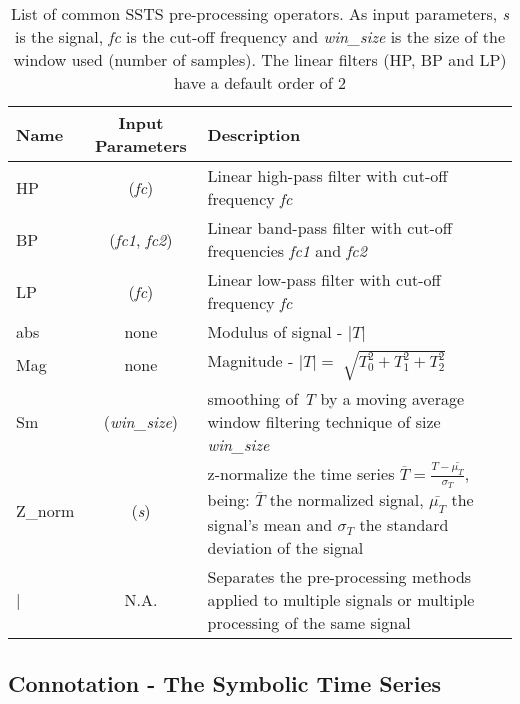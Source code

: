 \begin{center}
\begin{table}
	\centering
    \setlength{\tabcolsep}{3pt}
	\renewcommand{\arraystretch}{1.5}
	\caption{List of common \gls{SSTS} pre-processing operators. As input parameters, \textit{s} is the signal, \textit{fc} is the cut-off frequency and \textit{win\_size} is the size of the window used (number of samples). The linear filters (HP, BP and LP) have a default order of 2}
	~\\~
	\label{tab:preprocess}
	\begin{tabular}{lcP}
        \toprule[0.5mm]
		Name & Input Parameters & Description\\
        \midrule[0.3mm]
		HP & (\textit{fc}) & Linear high-pass filter with cut-off frequency \textit{fc}\\
        \midrule
		BP & (\textit{fc1}, \textit{fc2}) & Linear band-pass filter with cut-off frequencies \textit{fc1} and \textit{fc2}\\ 
        \midrule
 		LP & (\textit{fc}) & Linear low-pass filter with cut-off frequency \textit{fc}\\
        \midrule
        abs & none & Modulus of signal - $|T|$\\
        \midrule
        Mag & none & Magnitude - $|T| = \sqrt[]{T_0^2 + T_1^2 + T_2^2}$\\
        \midrule
        Sm &  (\textit{win\_size}) & smoothing of \textit{T} by a moving average window filtering technique of size \textit{win\_size}\\
        \midrule
        Z_{norm} & (\textit{s}) & z-normalize the time series $\overline{T} = \frac{T-\bar{\mu_T}}{\sigma_T}$, being: $\overline{T}$ the normalized signal, $\bar{\mu_T}$ the signal's mean and $\sigma_T$ the standard deviation of the signal\\
        \midrule
        | & N.A. & Separates the pre-processing methods applied to multiple signals or multiple processing of the same signal\\
        \bottomrule[0.5mm]
 	\hline
	\end{tabular}
\end{table}
\end{center}

\subsection{Connotation - The Symbolic Time Series}
\label{subsec:symbolic_connotation}


